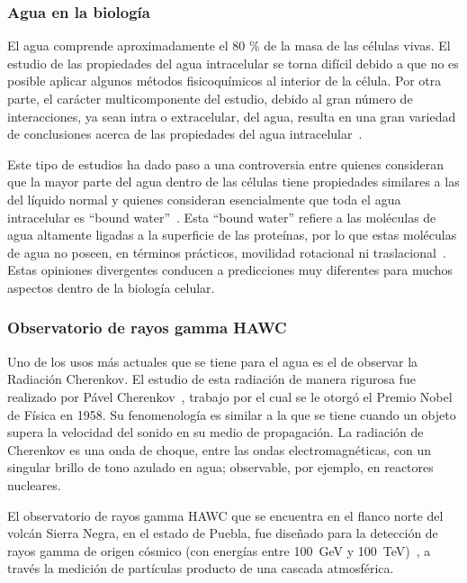 \subsubsection{Agua en la biología}

El agua comprende aproximadamente el 80 \% de la masa de las células vivas. El
estudio de las propiedades del agua intracelular se torna difícil debido a que
no es posible aplicar algunos métodos fisicoquímicos al interior de la célula.
Por otra parte, el carácter multicomponente del estudio, debido al gran número
de interacciones, ya sean intra o extracelular, del agua, resulta en una gran
variedad de conclusiones acerca de las propiedades del agua
intracelular~\cite{Cooke1974}.

Este tipo de estudios ha dado paso a una controversia entre quienes consideran
que la mayor parte del agua dentro de las células tiene propiedades similares a
las del líquido normal y quienes consideran esencialmente que toda el agua
intracelular es ``bound water''~\cite{BenNaim1992, Hepler1969}. Esta ``bound
water'' refiere a las moléculas de agua altamente ligadas a la superficie de
las proteínas, por lo que estas moléculas de agua no poseen, en términos
prácticos, movilidad rotacional ni traslacional~\cite{Bagchi}. Estas opiniones
divergentes conducen a predicciones muy diferentes para muchos aspectos dentro
de la biología celular.


\subsubsection{Observatorio de rayos gamma HAWC}

Uno de los usos más actuales que se tiene para el agua es el de observar la
Radiación Cherenkov. El estudio de esta radiación de manera rigurosa fue
realizado por Pável Cherenkov~\cite{cherenkov}, trabajo por el cual se le
otorgó el Premio Nobel de Física en 1958. Su fenomenología es similar a la que
se tiene cuando un objeto supera la velocidad del sonido en su medio de
propagación. La radiación de Cherenkov es una onda de choque, entre las ondas
electromagnéticas, con un singular brillo de tono azulado en agua; observable,
por ejemplo, en reactores nucleares.

El observatorio de rayos gamma HAWC que se encuentra en el flanco norte del
volcán Sierra Negra, en el estado de Puebla, fue diseñado para la detección de
rayos gamma de origen cósmico (con energías entre \SI{100}{\giga \electronvolt}
y \SI{100}{\tera \electronvolt})~\cite{HAWC}, a través la medición de
partículas producto de una cascada atmosférica. 

